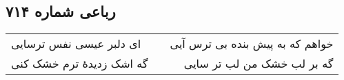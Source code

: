 \begin{center}
\section*{رباعی شماره ۷۱۴}
\label{sec:sh714}
\begin{longtable}{l p{0.5cm} r}
ای دلبر عیسی نفس ترسایی
&&
خواهم که به پیش بنده بی ترس آیی
\\
گه اشک زدیدهٔ ترم خشک کنی
&&
گه بر لب خشک من لب تر سایی
\\
\end{longtable}
\end{center}
